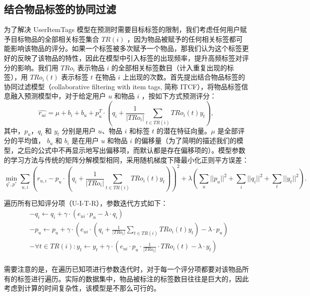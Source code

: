 \subsection{结合物品标签的协同过滤}
为了解决 UserItemTags 模型在预测时需要目标标签的限制，我们考虑任何用户赋予目标物品的全部相关标签集合 $TR(i)$ ，因为物品被赋予的任何相关标签都可能影响该物品的评分。如果一个标签被多次赋予一个物品，那我们认为这个标签更好的反映了该物品的特性，因此在模型中引入标签的出现频率，提升高频标签对评分的影响。我们用 $TRo_i$ 表示物品 $i$ 的全部相关标签数目（计入重复出现的标签），用 $TRo_i(t)$ 表示标签 $t$ 在物品 $i$ 上出现的次数。首先提出结合物品标签的协同过滤模型（collaborative filtering with item tags, 简称 ITCF），将物品标签信息融入预测模型中，对于给定用户 $u$ 和物品 $i$ ，按如下方式预测评分：
\begin{equation}
\hat{r_{ui}} =  \mu + b_i + b_u  +  p_u^T \cdot (q_i + \frac{1}{|TRo_i|}  \sum\limits_{t  \in TR(i)} {TRo_i(t) y_t}  ),
\end{equation}
其中，$p_u$，$q_i$ 和 $y_t$ 分别是用户 $u$、物品 $i$ 和标签 $t$ 的潜在特征向量。$\mu$ 是全部评分的平均值， $b_u$ 和 $b_i$ 是在用户 $u$ 和物品 $i$ 的偏移量（为了简明的描述我们的模型，之后的公式中不再显示地写出偏移项，而默认都是存在偏移项的）。模型参数的学习方法与传统的矩阵分解模型相同，采用随机梯度下降最小化正则平方误差：
\begin{equation}
\min_{q^*, p^*} {
\sum\limits_{u,i} {(r_{u,i} -  p_u \cdot (q_i + \frac{1}{|TRo_i|}\sum\limits_{t \in TR(i)}{TRo_i(t) y_t}))^2}
+ \lambda( \sum\limits_{u} ||p_u||^2+ \sum\limits_{i} ||q_i||^2 + \sum\limits_{t} ||y_t||^2 )}.
\end{equation}


遍历所有已知评分项（U-I-T-R），参数迭代方式如下：
\begin{equation}
\begin{aligned}
&-q_i \leftarrow q_i + \gamma \cdot(e_{ui} \cdot p_u -\lambda \cdot q_i)     \\
&-p_u \leftarrow p_u + \gamma \cdot(e_{ui} \cdot (q_i + \frac{1}{|TRo_i|}  \sum\limits_{t  \in TR(i)} {TRo_i(t) y_t})- \lambda \cdot p_u)    \\
&-\forall t \in TR(i) : y_t \leftarrow y_t + \gamma \cdot(e_{ui} \cdot p_u \cdot \frac{1}{|TRo_i|} \cdot TRo_i(t)  -\lambda \cdot y_t)     \\
\end{aligned}
\end{equation}

需要注意的是，在遍历已知项进行参数迭代时，对于每一个评分项都要对该物品所有的标签进行遍历。实际的数据集中，物品被标注的标签数目往往是巨大的，因此考虑到计算的时间复杂性，该模型是不那么可行的。

